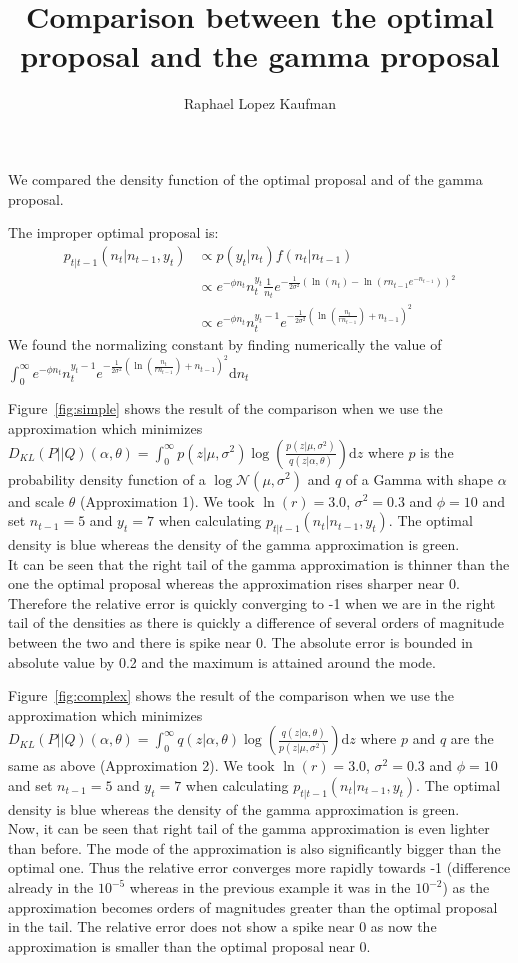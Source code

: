 \documentclass{article}
\title{Comparison between the optimal proposal and the gamma proposal}
\author{Raphael Lopez Kaufman}
\date{}
\begin{document}
We compared the density function of the optimal proposal and of the gamma proposal.

The improper optimal proposal is:
\begin{equation*}
\begin{split}
p_{t|t-1}(n_t|n_{t-1}, y_t) & \propto  p(y_t|n_t)f(n_t|n_{t-1}) \\
& \propto e^{-\phi n_t}n_t^{y_t}\frac{1}{n_t} e^{-\frac{1}{2\sigma^2}(\ln(n_t)-\ln(rn_{t-1}e^{-n_{t-1}}))^2} \\
& \propto e^{-\phi n_t}n_t^{y_t-1}e^{-\frac{1}{2\sigma^2}(\ln(\frac{n_t}{rn_{t-1}})+n_{t-1})^2}
\end{split}
\end{equation*}
We found the normalizing constant by finding numerically the value of $\int_{0}^{\infty}e^{-\phi n_t}n_t^{y_t-1}e^{-\frac{1}{2\sigma^2}(\ln(\frac{n_t}{rn_{t-1}})+n_{t-1})^2} \mathrm{d}n_t$

Figure~\ref{fig:simple} shows the result of the comparison when we use the approximation which minimizes $D_{KL}(P||Q)(\alpha, \theta) = \int_{0}^{\infty}{p(z|\mu, \sigma^2)\log(\frac{p(z|\mu, \sigma^2)}{q(z|\alpha, \theta)})\mathrm{d}z}$
where $p$ is the probability density function of a $\log\mathcal{N}(\mu, \sigma^2)$ and $q$ of a Gamma with shape $\alpha$ and scale $\theta$ (Approximation 1). We took $\ln(r) = 3.0$, $\sigma^2 = 0.3$ and $\phi = 10$ and set $n_{t-1} = 5$ and $y_t = 7$ when calculating $p_{t|t-1}(n_t|n_{t-1}, y_t)$. The optimal density is blue whereas the density of the gamma approximation is green. \\
It can be seen that the right tail of the gamma approximation is thinner than the one the optimal proposal whereas the approximation rises sharper near 0. Therefore the relative error is quickly converging to -1 when we are in the right tail of the densities as there is quickly a difference of several orders of magnitude between the two and there is spike near 0. The absolute error is bounded in absolute value by 0.2 and the maximum is attained around the mode. 

Figure~\ref{fig:complex} shows the result of the comparison when we use the approximation which minimizes $	D_{KL}(P||Q)(\alpha, \theta) = \int_{0}^{\infty}{q(z|\alpha, \theta)\log(\frac{q(z|\alpha, \theta)}{p(z|\mu, \sigma^2)})\mathrm{d}z}$
where $p$ and $q$ are the same as above (Approximation 2). We took $\ln(r) = 3.0$, $\sigma^2 = 0.3$ and $\phi = 10$ and set $n_{t-1} = 5$ and $y_t = 7$ when calculating $p_{t|t-1}(n_t|n_{t-1}, y_t)$. The optimal density is blue whereas the density of the gamma approximation is green. \\
Now, it can be seen that right tail of the gamma approximation is even lighter than before. The mode of the approximation is also significantly bigger than the optimal one. Thus the relative error converges more rapidly towards -1 (difference already in the $10^{-5}$ whereas in the previous example it was in the $10^{-2}$) as the approximation becomes orders of magnitudes greater than the optimal proposal in the tail. The relative error does not show a spike near 0 as now the approximation is smaller than the optimal proposal near 0.
\end{document}
